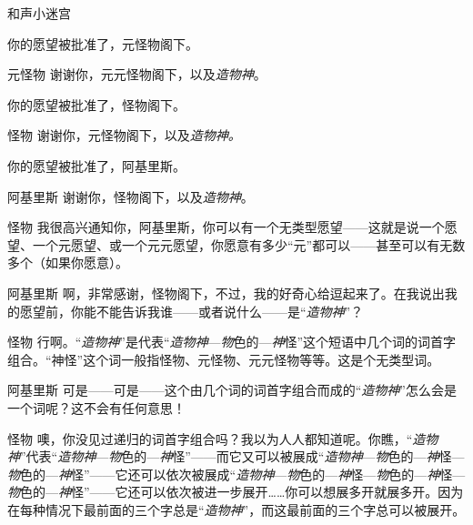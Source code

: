 \begin{dialog}{和声小迷宫}
\begin{dialogue}
\begin{dialogue}
\begin{dialogue}
\begin{dialogue}
\begin{dialogue}

        你的愿望被批准了，元怪物阁下。
      \end{dialogue}

      \item[元怪物]谢谢你，元元怪物阁下，以及\emph{造物神}。


      你的愿望被批准了，怪物阁下。
    \end{dialogue}

    \item[怪物]谢谢你，元怪物阁下，以及\emph{造物神。}


    你的愿望被批准了，阿基里斯。


    \item[阿基里斯]谢谢你，怪物阁下，以及\emph{造物神}。

    \item[怪物]我很高兴通知你，阿基里斯，你可以有一个无类型愿望——这就是说一个愿望、一个元愿望、或一个元元愿望，你愿意有多少“元”都可以——甚至可以有无数多个（如果你愿意）。

    \item[阿基里斯]啊，非常感谢，怪物阁下，不过，我的好奇心给逗起来了。在我说出我的愿望前，你能不能告诉我谁——或者说什么——是“\emph{造物神}”？

    \item[怪物]行啊。“\emph{造物神}”是代表“\emph{造物神}—\emph{物}色的—\emph{神}怪”这个短语中几个词的词首字组合。“神怪”这个词一般指怪物、元怪物、元元怪物等等。这是个无类型词。

    \item[阿基里斯]可是——可是——这个由几个词的词首字组合而成的“\emph{造物神}”怎么会是一个词呢？这不会有任何意思！

    \item[怪物]噢，你没见过递归的词首字组合吗？我以为人人都知道呢。你瞧，“\emph{造物神}”代表“\emph{造物神}—\emph{物}色的—\emph{神}怪”——而它又可以被展成“\emph{造物神}—\emph{物}色的—\emph{神}怪—\emph{物}色的—\emph{神}怪”——它还可以依次被展成“\emph{造物神}—\emph{物}色的—\emph{神}怪—\emph{物}色的—\emph{神}怪—\emph{物}色的—\emph{神}怪”——它还可以依次被进一步展开……你可以想展多开就展多开。因为在每种情况下最前面的三个字总是“\emph{造物神}”，而这最前面的三个字总可以被展开。


\end{dialogue}
\end{dialogue}
\end{dialogue}
\end{dialog}

